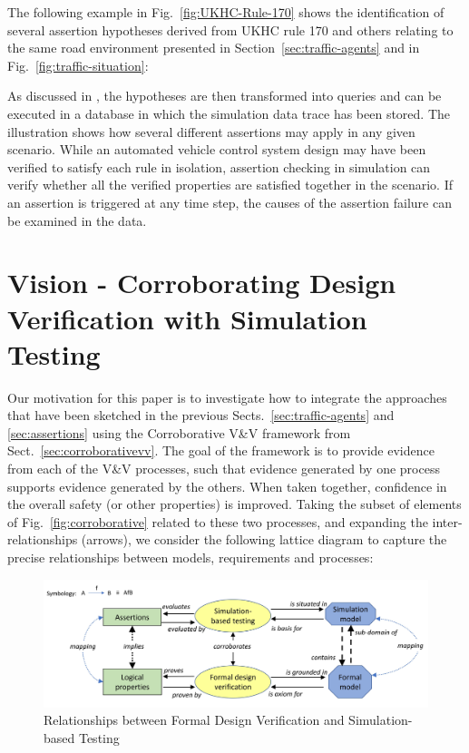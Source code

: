 \documentclass[runningheads,twocolumn,a4paper,10pt]{llncs}
\begin{document}
The following example in Fig.~\ref{fig:UKHC-Rule-170} shows the identification of several assertion hypotheses derived from UKHC rule 170 and others relating to the same road environment presented in Section~\ref{sec:traffic-agents} and in Fig.~\ref{fig:traffic-situation}:


As discussed in \cite{Harper21}, the hypotheses are then transformed into queries and can be executed in a database in which the simulation data trace has been stored. The illustration shows how several different assertions may apply in any given scenario. While an automated vehicle control system design may have been verified to satisfy each rule in isolation, assertion checking in simulation can verify whether all the verified properties are satisfied together in the scenario. If an assertion is triggered at any time step, the causes of the assertion failure can be examined in the data.

\section{Vision - Corroborating Design Verification with Simulation Testing}\label{sec:vision}

Our motivation for this paper is to investigate how to integrate the approaches that have been sketched in the previous Sects.~\ref{sec:traffic-agents} and \ref{sec:assertions} using the Corroborative V\&V framework from Sect.~\ref{sec:corroborativevv}. 
The goal of the framework is to provide evidence from each of the V\&V processes, such that evidence generated by one process supports evidence generated by the others. When taken together, confidence in the overall safety (or other properties) is improved. Taking the subset of elements of Fig.~\ref{fig:corroborative} related to these two processes, and expanding the inter-relationships (arrows), we consider the following lattice diagram to capture the precise relationships between models, requirements and processes:
\begin{figure}[]
    \centering
    \includegraphics[width=0.85\linewidth]{Figures/Lattice_diagram_v3.jpg}
    \caption{Relationships between Formal Design Verification and Simulation-based Testing %
    }
    \label{fig:Lattice-diagram}
\end{figure}
\end{document}
